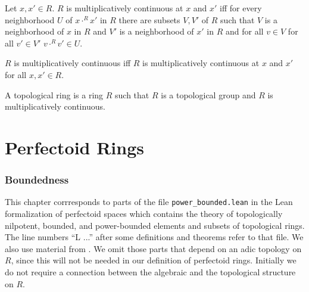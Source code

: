 \documentclass[11pt]{article}
\begin{document}
\begin{forthel}

\begin{definition}
Let $x,x' \in R$. $R$ is multiplicatively continuous at $x$ and $x'$ iff
for every neighborhood $U$ of $x \cdot^{R} x'$ in $R$
there are subsets $V,V'$ of $R$ such that 
$V$ is a neighborhood of $x$ in $R$ and $V'$ is a neighborhood
of $x'$ in $R$ and for all $v \in V$ for all $v' \in V'$ 
$v \cdot^{R} v' \in U$.
\end{definition}

\begin{definition}
$R$ is multiplicatively continuous iff $R$ is multiplicatively continuous at
$x$ and $x'$ for all $x,x' \in R$.
\end{definition}

\begin{definition}[title = Topological ring]
A topological ring is a ring $R$ such that $R$ is a topological group
and $R$ is multiplicatively continuous.
\end{definition}

\end{forthel}

\part{Perfectoid Rings}

\section{Boundedness}

This chapter corrresponds to parts of the file \verb+power_bounded.lean+
in the Lean formalization of perfectoid spaces \cite{Lean} which contains
the theory of topologically nilpotent, bounded, and power-bounded
elements and subsets of topological rings. The line numbers ``L ...'' after
some definitions and theorems refer to that file.
We also use material from \cite{Wedhhorn2019}.
We omit those parts that depend on an adic topology on $R$, since this
will not be needed in our definition of perfectoid rings.
Initially we do not require a connection between the
algebraic and the topological structure on $R$.
\end{document}
